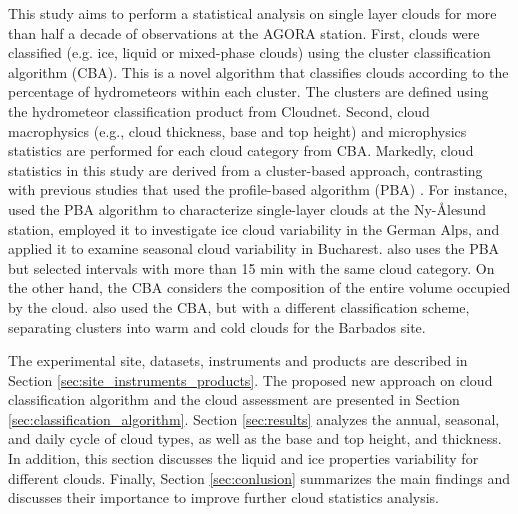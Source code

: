 This study aims to perform a statistical analysis on single layer clouds for more than half a decade of observations at the AGORA station. First, clouds were classified (e.g. ice, liquid or mixed-phase clouds) using the cluster classification algorithm (CBA). This is a novel algorithm that classifies clouds according to the percentage of hydrometeors within each cluster. The clusters are defined using the hydrometeor classification product from Cloudnet.
Second, cloud macrophysics (e.g., cloud thickness, base and top height) and microphysics statistics are performed for each cloud category from CBA. Markedly, cloud statistics in this study are derived from a cluster-based approach, contrasting with previous studies that used the profile-based algorithm (PBA) \citep{pirloagaGroundBasedMeasurementsCloud2022,nomokonovaStatisticsCloudsTheir2019,kneifelMultiyearCloudPrecipitation2022}.
For instance, \cite{nomokonovaStatisticsCloudsTheir2019} used the PBA algorithm to characterize single-layer clouds at the Ny-Ålesund station, \cite{kneifelMultiyearCloudPrecipitation2022} employed it to investigate ice cloud variability in the German Alps, and \cite{pirloagaGroundBasedMeasurementsCloud2022} applied it to examine seasonal cloud variability in Bucharest. \cite{buhlMeasuringIceLiquidwater2016} also uses the PBA but selected intervals with more than 15 min with the same cloud category. On the other hand, the CBA considers the composition of the entire volume occupied by the cloud. \cite{roschkeDiscriminatingDrizzleRain2024} also used the CBA, but with a different classification scheme, separating clusters into warm and cold clouds for the Barbados site. 


The experimental site, datasets, instruments and products are described in Section \ref{sec:site_instruments_products}. The proposed new approach on cloud classification algorithm and the cloud assessment are presented in Section \ref{sec:classification_algorithm}. Section \ref{sec:results} analyzes the annual, seasonal, and daily cycle of cloud types, as well as the base and top height, and thickness. In addition, this section discusses the liquid and ice properties variability for different clouds. Finally, Section \ref{sec:conlusion} summarizes the main findings and discusses their importance to improve further cloud statistics analysis.
